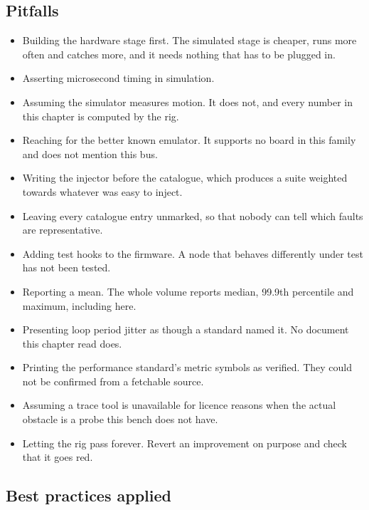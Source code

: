 \subsection*{Pitfalls}

\begin{itemize}
\item Building the hardware stage first. The simulated stage is cheaper, runs
more often and catches more, and it needs nothing that has to be plugged in.
\item Asserting microsecond timing in simulation.
\item Assuming the simulator measures motion. It does not, and every number in
this chapter is computed by the rig.
\item Reaching for the better known emulator. It supports no board in this
family and does not mention this bus.
\item Writing the injector before the catalogue, which produces a suite weighted
towards whatever was easy to inject.
\item Leaving every catalogue entry unmarked, so that nobody can tell which
faults are representative.
\item Adding test hooks to the firmware. A node that behaves differently under
test has not been tested.
\item Reporting a mean. The whole volume reports median, 99.9th percentile and
maximum, including here.
\item Presenting loop period jitter as though a standard named it. No document
this chapter read does.
\item Printing the performance standard's metric symbols as verified. They could
not be confirmed from a fetchable source.
\item Assuming a trace tool is unavailable for licence reasons when the actual
obstacle is a probe this bench does not have.
\item Letting the rig pass forever. Revert an improvement on purpose and check
that it goes red.
\end{itemize}

\subsection*{Best practices applied}

